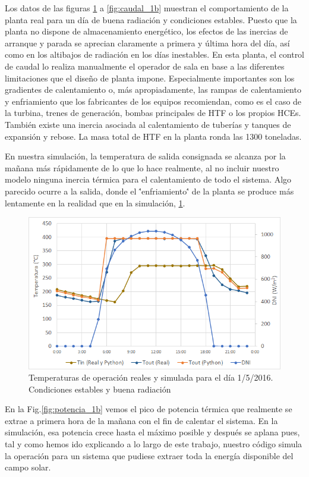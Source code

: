 Los datos de las figuras \ref{fig:temperatura_1b} a \ref{fig:caudal_1b} muestran el comportamiento de la planta real para un día de buena radiación y condiciones estables. Puesto que la planta no dispone de almacenamiento energético, los efectos de las inercias de arranque y parada se aprecian claramente a primera y última hora del día, así como en los altibajos de radiación en los días inestables. En esta planta, el control de caudal lo realiza manualmente el operador de sala en base a las diferentes limitaciones que el diseño de planta impone. Especialmente importantes son los gradientes de calentamiento o, más apropiadamente, las rampas de calentamiento y enfriamiento que los fabricantes de los equipos recomiendan, como es el caso de la turbina, trenes de generación, bombas principales de HTF o los propios HCEs. También existe una inercia asociada al calentamiento de tuberías y tanques de expansión y rebose.  La masa total de HTF en la planta ronda las 1300 toneladas. 

En nuestra simulación, la temperatura de salida consignada se alcanza por la mañana más rápidamente de lo que lo hace realmente, al no incluir nuestro modelo ninguna inercia térmica para el calentamiento de todo el sistema. Algo parecido ocurre a la salida, donde el \''enfriamiento\'' de la planta se produce más lentamente en la realidad que en la simulación, \ref{fig:temperatura_1b}.

\begin{figure}[h!]
\includegraphics[width=0.9\linewidth]{images/temperatura_aste1b_01052016.png}
\caption{Temperaturas de operación reales y simulada para el día 1/5/2016. Condiciones estables y buena radiación} 
\label{fig:temperatura_1b}
\end{figure}

En la  Fig.\ref{fig:potencia_1b} vemos el pico de potencia térmica que realmente se extrae a primera hora de la mañana con el fin de calentar el sistema. En la simulación, esa potencia crece hasta el máximo posible y después se aplana pues, tal y como hemos ido explicando a lo largo de este trabajo, nuestro código simula la operación para un sistema que pudiese extraer toda la energía disponible del campo solar. 

